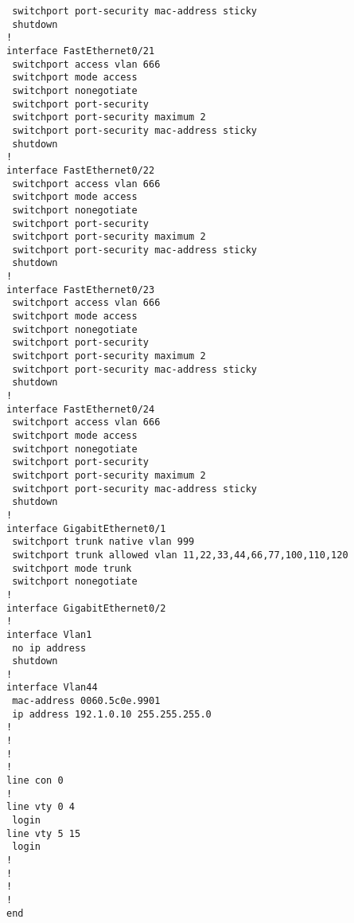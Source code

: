 \begin{verbatim}
 switchport port-security mac-address sticky 
 shutdown
!
interface FastEthernet0/21
 switchport access vlan 666
 switchport mode access
 switchport nonegotiate
 switchport port-security
 switchport port-security maximum 2
 switchport port-security mac-address sticky 
 shutdown
!
interface FastEthernet0/22
 switchport access vlan 666
 switchport mode access
 switchport nonegotiate
 switchport port-security
 switchport port-security maximum 2
 switchport port-security mac-address sticky 
 shutdown
!
interface FastEthernet0/23
 switchport access vlan 666
 switchport mode access
 switchport nonegotiate
 switchport port-security
 switchport port-security maximum 2
 switchport port-security mac-address sticky 
 shutdown
!
interface FastEthernet0/24
 switchport access vlan 666
 switchport mode access
 switchport nonegotiate
 switchport port-security
 switchport port-security maximum 2
 switchport port-security mac-address sticky 
 shutdown
!
interface GigabitEthernet0/1
 switchport trunk native vlan 999
 switchport trunk allowed vlan 11,22,33,44,66,77,100,110,120
 switchport mode trunk
 switchport nonegotiate
!
interface GigabitEthernet0/2
!
interface Vlan1
 no ip address
 shutdown
!
interface Vlan44
 mac-address 0060.5c0e.9901
 ip address 192.1.0.10 255.255.255.0
!
!
!
!
line con 0
!
line vty 0 4
 login
line vty 5 15
 login
!
!
!
!
end
\end{verbatim}


\clearpage
